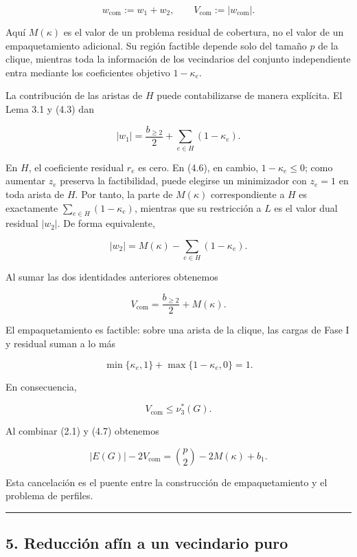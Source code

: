 \documentclass[
  spanish,
  11pt,
  a4paper,
]{article}
\begin{document}
\[
w_{\mathrm{com}}:=w_1+w_2,
\qquad
V_{\mathrm{com}}:=|w_{\mathrm{com}}|.
\]

Aquí \(M(\kappa)\) es el valor de un problema residual de cobertura, no el valor de un empaquetamiento adicional. Su región factible depende solo del tamaño \(p\) de la clique, mientras toda la información de los vecindarios del conjunto independiente entra mediante los coeficientes objetivo \(1-\kappa_e\).

La contribución de las aristas de \(H\) puede contabilizarse de manera explícita. El Lema 3.1 y (4.3) dan

\[
|w_1|
=
\frac{b_{\ge2}}2+\sum_{e\in H}(1-\kappa_e).
\]

En \(H\), el coeficiente residual \(r_e\) es cero. En (4.6), en cambio, \(1-\kappa_e\le0\); como aumentar \(z_e\) preserva la factibilidad, puede elegirse un minimizador con \(z_e=1\) en toda arista de \(H\). Por tanto, la parte de \(M(\kappa)\) correspondiente a \(H\) es exactamente \(\sum_{e\in H}(1-\kappa_e)\), mientras que su restricción a \(L\) es el valor dual residual \(|w_2|\). De forma equivalente,

\[
|w_2|=M(\kappa)-\sum_{e\in H}(1-\kappa_e).
\]

Al sumar las dos identidades anteriores obtenemos

\[
\boxed{
V_{\mathrm{com}}
=
\frac{b_{\ge2}}2+M(\kappa).
}
\tag{4.7}
\]

El empaquetamiento es factible: sobre una arista de la clique, las cargas de Fase I y residual suman a lo más

\[
\min\{\kappa_e,1\}
+
\max\{1-\kappa_e,0\}
=
1.
\]

En consecuencia,

\[
V_{\mathrm{com}}\le\nu_3^*(G).
\tag{4.8}
\]

Al combinar (2.1) y (4.7) obtenemos

\[
\boxed{
|E(G)|-2V_{\mathrm{com}}
=
\binom{p}{2}-2M(\kappa)+b_1.
}
\tag{4.9}
\]

Esta cancelación es el puente entre la construcción de empaquetamiento y el problema de perfiles.

\begin{center}\rule{0.5\linewidth}{0.5pt}\end{center}

\subsection{5. Reducción afín a un vecindario puro}\label{reducciuxf3n-afuxedn-a-un-vecindario-puro}
\end{document}
